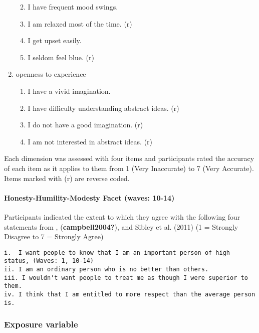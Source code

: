 \documentclass[
  letterpaper,
  DIV=11,
  numbers=noendperiod]{scrartcl}
\let\oldparagraph\paragraph
\renewcommand{\paragraph}[1]{\oldparagraph{#1}\mbox{}}
\providecommand{\tightlist}{%
  \setlength{\itemsep}{0pt}\setlength{\parskip}{0pt}}\usepackage{longtable,booktabs,array}
\begin{document}
\begin{enumerate}
  \begin{enumerate}
  \def\labelenumii{\roman{enumii}.}
  \tightlist
  \item
    I have frequent mood swings.
  \item
    I am relaxed most of the time. (r)
  \item
    I get upset easily.
  \item
    I seldom feel blue. (r)
  \end{enumerate}
\item
  openness to experience

  \begin{enumerate}
  \def\labelenumii{\roman{enumii}.}
  \tightlist
  \item
    I have a vivid imagination.
  \item
    I have difficulty understanding abstract ideas. (r)
  \item
    I do not have a good imagination. (r)
  \item
    I am not interested in abstract ideas. (r)
  \end{enumerate}
\end{enumerate}

Each dimension was assessed with four items and participants rated the
accuracy of each item as it applies to them from 1 (Very Inaccurate) to
7 (Very Accurate). Items marked with (r) are reverse coded.

\hypertarget{honesty-humility-modesty-facet-waves-10-14}{%
\paragraph{Honesty-Humility-Modesty Facet (waves:
10-14)}\label{honesty-humility-modesty-facet-waves-10-14}}

Participants indicated the extent to which they agree with the following
four statements from , (\textbf{campbell2004?}), and Sibley et al.
(2011) (1 = Strongly Disagree to 7 = Strongly Agree)

\begin{verbatim}
i.  I want people to know that I am an important person of high status, (Waves: 1, 10-14)
ii. I am an ordinary person who is no better than others.
iii. I wouldn't want people to treat me as though I were superior to them.
iv. I think that I am entitled to more respect than the average person is.
\end{verbatim}

\hypertarget{exposure-variable}{%
\subsubsection{Exposure variable}\label{exposure-variable}}
\end{document}

